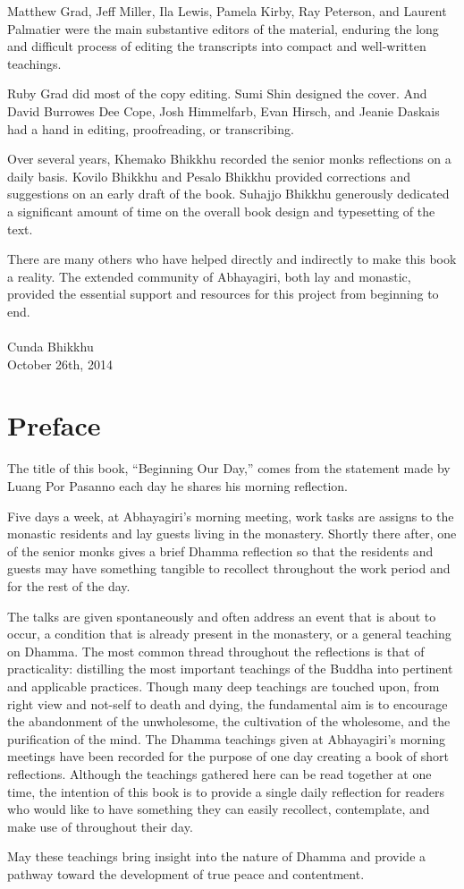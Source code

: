 \documentclass[11pt,openany]{memoir}
\begin{document}
Matthew Grad, Jeff Miller, Ila Lewis, Pamela Kirby, Ray Peterson, and
Laurent Palmatier were the main substantive editors of the material,
enduring the long and difficult process of editing the transcripts into
compact and well-written teachings.

Ruby Grad did most of the copy editing. Sumi Shin designed the cover.
And David Burrowes Dee Cope, Josh Himmelfarb, Evan Hirsch, and Jeanie
Daskais had a hand in editing, proofreading, or transcribing.

Over several years, Khemako Bhikkhu recorded the senior monks
reflections on a daily basis. Kovilo Bhikkhu and Pesalo Bhikkhu provided
corrections and suggestions on an early draft of the book. Suhajjo
Bhikkhu generously dedicated a significant amount of time on the overall
book design and typesetting of the text.

There are many others who have helped directly and indirectly to make
this book a reality. The extended community of Abhayagiri, both lay and
monastic, provided the essential support and resources for this project
from beginning to end.\\
\mbox{}\\
\noindent Cunda Bhikkhu\\
October 26th, 2014\nowidow[5]

\pagestyle{plain}
\chapter{Preface}

The title of this book, ``Beginning Our Day,'' comes from the statement
made by Luang Por Pasanno each day he shares his morning reflection. 

Five days a week, at Abhayagiri's morning meeting, work tasks are
assigns to the monastic residents and lay guests living in the
monastery. Shortly there after, one of the senior monks gives a brief
Dhamma reflection so that the residents and guests may have something
tangible to recollect throughout the work period and for the rest of the
day. 

The talks are given spontaneously and often address an event that is
about to occur, a condition that is already present in the monastery, or
a general teaching on Dhamma. The most common thread throughout the
reflections is that of practicality: distilling the most important
teachings of the Buddha into pertinent and applicable practices. Though
many deep teachings are touched upon, from right view and not-self to
death and dying, the fundamental aim is to encourage the abandonment of
the unwholesome, the cultivation of the wholesome, and the purification
of the mind.
The Dhamma teachings given at Abhayagiri's morning meetings have been
recorded for the purpose of one day creating a book of short
reflections. Although the teachings gathered here can be read together
at one time, the intention of this book is to provide a single daily
reflection for readers who would like to have something they can easily
recollect, contemplate, and make use of throughout their day. 

May these teachings bring insight into the nature of Dhamma and provide
a pathway toward the development of true peace and contentment.

\mainmatter
\end{document}

